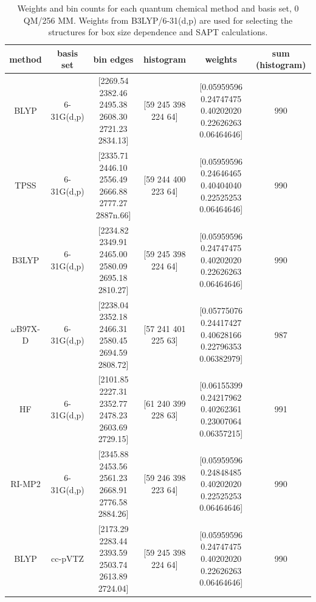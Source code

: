 \begin{landscape}
  \begin{table}
    \centering
    \caption[Histogram and weights of frequency distributions from MD snapshots]{Weights and bin counts for each quantum chemical method and basis set, 0 QM/256 MM. Weights from B3LYP/6-31(d,p) are used for selecting the structures for box size dependence and SAPT calculations.}
    \label{paper_02:tab:S2}
    \small
    \begin{tabular}{cccccc}
      \toprule
      method & basis set & bin edges & histogram & weights & sum (histogram) \\
      \midrule
      BLYP & 6-31G(d,p) & \makecell{[2269.54 2382.46 2495.38 \\ 2608.30 2721.23 2834.13]} & [59 245 398 224 64] & \makecell{[0.05959596 0.24747475 0.40202020 \\ 0.22626263 0.06464646]} & 990 \\
      TPSS & 6-31G(d,p) & \makecell{[2335.71 2446.10 2556.49 \\ 2666.88 2777.27 2887n.66]} & [59 244 400 223 64] & \makecell{[0.05959596 0.24646465 0.40404040 \\ 0.22525253 0.06464646]} & 990 \\
      B3LYP & 6-31G(d,p) & \makecell{[2234.82 2349.91 2465.00 \\ 2580.09 2695.18 2810.27]} & [59 245 398 224 64] & \makecell{[0.05959596 0.24747475 0.40202020 \\ 0.22626263 0.06464646]} & 990 \\
      \(\omega\)B97X-D & 6-31G(d,p) & \makecell{[2238.04 2352.18 2466.31 \\ 2580.45 2694.59 2808.72]} & [57 241 401 225 63] & \makecell{[0.05775076 0.24417427 0.40628166 \\ 0.22796353 0.06382979]} & 987 \\
      HF & 6-31G(d,p) & \makecell{[2101.85 2227.31 2352.77 \\ 2478.23 2603.69 2729.15]} & [61 240 399 228 63] & \makecell{[0.06155399 0.24217962 0.40262361 \\ 0.23007064 0.06357215]} & 991 \\
      RI-MP2 & 6-31G(d,p) & \makecell{[2345.88 2453.56 2561.23 \\ 2668.91 2776.58 2884.26]} & [59 246 398 223 64] & \makecell{[0.05959596 0.24848485 0.40202020 \\ 0.22525253 0.06464646]} & 990 \\
      BLYP & cc-pVTZ & \makecell{[2173.29 2283.44 2393.59 \\ 2503.74 2613.89 2724.04]} & [59 245 398 224 64] & \makecell{[0.05959596 0.24747475 0.40202020 \\ 0.22626263 0.06464646]} & 990 \\

\end{tabular}
\end{table}
\end{landscape}
